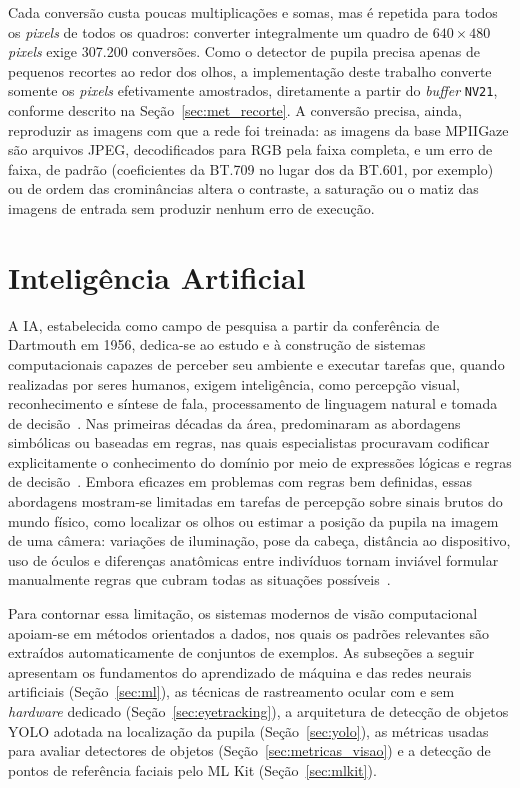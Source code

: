 Cada conversão custa poucas multiplicações e somas, mas é repetida para todos os \textit{pixels} de todos os quadros: converter integralmente um quadro de $640 \times 480$ \textit{pixels} exige 307.200 conversões. Como o detector de pupila precisa apenas de pequenos recortes ao redor dos olhos, a implementação deste trabalho converte somente os \textit{pixels} efetivamente amostrados, diretamente a partir do \textit{buffer} \texttt{NV21}, conforme descrito na Seção~\ref{sec:met_recorte}. A conversão precisa, ainda, reproduzir as imagens com que a rede foi treinada: as imagens da base MPIIGaze são arquivos JPEG, decodificados para RGB pela faixa completa, e um erro de faixa, de padrão (coeficientes da BT.709 no lugar dos da BT.601, por exemplo) ou de ordem das crominâncias altera o contraste, a saturação ou o matiz das imagens de entrada sem produzir nenhum erro de execução.

\section{Inteligência Artificial} \label{sec:ia}

A \gls{IA}, estabelecida como campo de pesquisa a partir da conferência de Dartmouth em 1956, dedica-se ao estudo e à construção de sistemas computacionais capazes de perceber seu ambiente e executar tarefas que, quando realizadas por seres humanos, exigem inteligência, como percepção visual, reconhecimento e síntese de fala, processamento de linguagem natural e tomada de decisão~\cite{russell2020ai}. Nas primeiras décadas da área, predominaram as abordagens simbólicas ou baseadas em regras, nas quais especialistas procuravam codificar explicitamente o conhecimento do domínio por meio de expressões lógicas e regras de decisão~\cite{goodfellow2016deep,russell2020ai}. Embora eficazes em problemas com regras bem definidas, essas abordagens mostram-se limitadas em tarefas de percepção sobre sinais brutos do mundo físico, como localizar os olhos ou estimar a posição da pupila na imagem de uma câmera: variações de iluminação, pose da cabeça, distância ao dispositivo, uso de óculos e diferenças anatômicas entre indivíduos tornam inviável formular manualmente regras que cubram todas as situações possíveis~\cite{goodfellow2016deep}.

Para contornar essa limitação, os sistemas modernos de visão computacional apoiam-se em métodos orientados a dados, nos quais os padrões relevantes são extraídos automaticamente de conjuntos de exemplos. As subseções a seguir apresentam os fundamentos do aprendizado de máquina e das redes neurais artificiais (Seção~\ref{sec:ml}), as técnicas de rastreamento ocular com e sem \textit{hardware} dedicado (Seção~\ref{sec:eyetracking}), a arquitetura de detecção de objetos YOLO adotada na localização da pupila (Seção~\ref{sec:yolo}), as métricas usadas para avaliar detectores de objetos (Seção~\ref{sec:metricas_visao}) e a detecção de pontos de referência faciais pelo ML Kit (Seção~\ref{sec:mlkit}).

